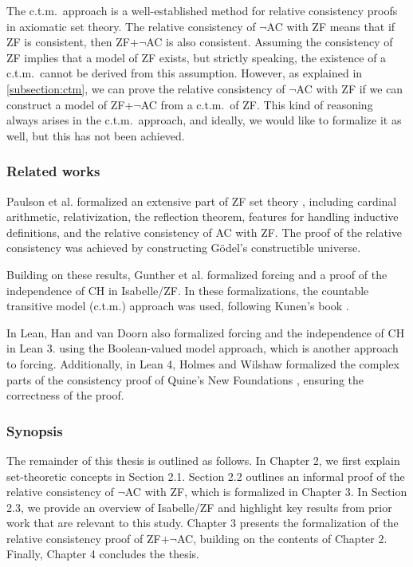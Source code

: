 \documentclass{report}
\begin{document}
The c.t.m.\  approach is a well-established method for relative consistency proofs in axiomatic set theory.
The relative consistency of $\neg$AC with ZF means that if ZF is consistent, then ZF+$\neg$AC is also consistent.
Assuming the consistency of ZF implies that a model of ZF exists, but strictly speaking, the existence of a c.t.m.\  cannot be derived from this assumption.
However, as explained in \cref{subsection:ctm}, we can prove the relative consistency of $\neg$AC with ZF if 
we can construct a model of ZF+$\neg$AC from a c.t.m.\  of ZF.
This kind of reasoning always arises in the c.t.m.\  approach, and ideally, 
we would like to formalize it as well, but this has not been achieved.


\subsubsection{Related works}
Paulson et al. formalized an extensive part of ZF set theory 
\cite{paulson_datatype_impl,paulson_reflection,paulson_AC_consistency,paulson_cardinal_AC,paulson_datatype}
, including cardinal arithmetic, relativization, the reflection theorem, features for handling inductive definitions, and the relative consistency of AC with ZF.
The proof of the relative consistency was achieved by constructing Gödel's constructible universe.

Building on these results, Gunther et al. formalized forcing and a proof of the independence of CH \cite{gunther_forcing,gunther_independence} in Isabelle/ZF.
In these formalizations, the countable transitive model (c.t.m.) approach was used, following Kunen's book \cite{kunen2011}.

In Lean, Han and van Doorn also formalized forcing and the independence of CH \cite{flypitch} in Lean 3.
using the Boolean-valued model approach, which is another approach to forcing.
Additionally, in Lean 4, Holmes and Wilshaw formalized the complex parts of the consistency proof of Quine's New Foundations \cite{NF_consistency}, ensuring the correctness of the proof.


\subsubsection{Synopsis}
The remainder of this thesis is outlined as follows.
In Chapter 2, we first explain set-theoretic concepts in Section 2.1.
Section 2.2 outlines an informal proof of the relative consistency of $\neg$AC with ZF, which is formalized in Chapter 3.
In Section 2.3, we provide an overview of Isabelle/ZF and highlight key results from prior work that are relevant to this study.
Chapter 3 presents the formalization of the relative consistency proof of ZF+$\neg$AC, building on the contents of Chapter 2.
Finally, Chapter 4 concludes the thesis.
\end{document}
